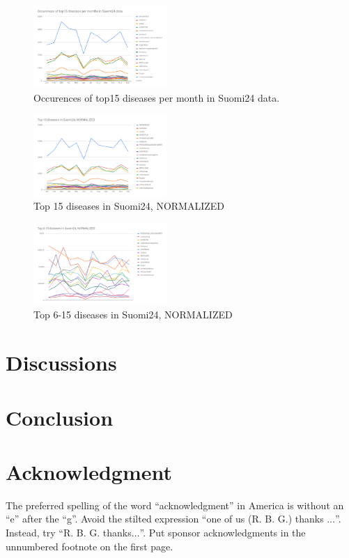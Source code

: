 \documentclass[conference]{IEEEtran}
\begin{document}
\begin{figure}[htbp]
    \centerline{\includegraphics[width=0.45\textwidth]{figures/fig18.png}}
    \caption{Occurences of top15 diseases per month in Suomi24 data.}
    \label{occurences_of_top15_diseases_per_month_in_suomi24_data}
\end{figure}

\begin{figure}[htbp]
    \centerline{\includegraphics[width=0.45\textwidth]{figures/fig19.png}}
    \caption{Top 15 diseases in Suomi24, NORMALIZED}
    \label{top_15_diseases_in_suomi24_NORMALIZED}
\end{figure}

\begin{figure}[htbp]
    \centerline{\includegraphics[width=0.45\textwidth]{figures/fig20.png}}
    \caption{Top 6-15 diseases in Suomi24, NORMALIZED}
    \label{top_6_15_diseases_in_suomi24_NORMALIZED}
\end{figure}

\section{Discussions}

\section{Conclusion}


\section*{Acknowledgment}

The preferred spelling of the word ``acknowledgment'' in America is without
an ``e'' after the ``g''. Avoid the stilted expression ``one of us (R. B.
G.) thanks $\ldots$''. Instead, try ``R. B. G. thanks$\ldots$''. Put sponsor
acknowledgments in the unnumbered footnote on the first page.



\end{document}
